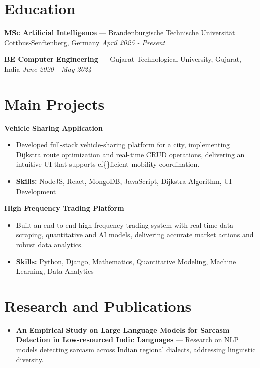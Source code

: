 \documentclass[a4paper,10pt]{article}
\begin{document}
\section*{Education}
\textbf{MSc Artificial Intelligence} — Brandenburgische Technische Universität Cottbus-Senftenberg, Germany \hfill \textit{April 2025 - Present}\par
\vspace{1.5pt}
\textbf{BE Computer Engineering} — Gujarat Technological University, Gujarat, India \hfill \textit{June 2020 - May 2024}\par

\section*{Main Projects}
\textbf{Vehicle Sharing Application}\par
\vspace{1pt}
\begin{itemize}
  \item Developed full-stack vehicle-sharing platform for a city, implementing Dijkstra route optimization and real-time CRUD operations, delivering an intuitive UI that supports ef\{\}ficient mobility coordination.
  \item \textbf{Skills:} NodeJS, React, MongoDB, JavaScript, Dijkstra Algorithm, UI Development
\end{itemize}
\vspace{3pt}
\textbf{High Frequency Trading Platform}\par
\vspace{1pt}
\begin{itemize}
  \item Built an end-to-end high-frequency trading system with real-time data scraping, quantitative and AI models, delivering accurate market actions and robust data analytics.
  \item \textbf{Skills:} Python, Django, Mathematics, Quantitative Modeling, Machine Learning, Data Analytics
\end{itemize}

\section*{Research and Publications}
\begin{itemize}
\item \textbf{An Empirical Study on Large Language Models for Sarcasm Detection in Low-resourced Indic Languages} — Research on NLP models detecting sarcasm across Indian regional dialects, addressing linguistic diversity.
\end{itemize}
\end{document}
